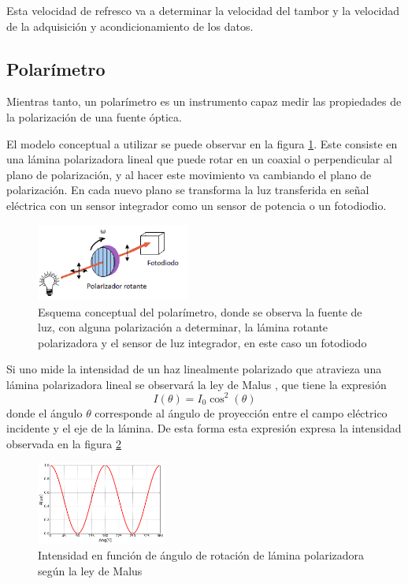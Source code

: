 Esta velocidad de refresco va a determinar la velocidad del tambor y la velocidad de la adquisición y acondicionamiento de los datos.

\subsection{Polarímetro}

Mientras tanto, un polarímetro es un instrumento capaz medir las propiedades de la polarización de una fuente óptica.

El modelo conceptual a utilizar se puede observar en la figura \ref{fig:polarimetro/esquema}. Este consiste en una lámina polarizadora lineal que puede rotar en un coaxial o perpendicular al plano de polarización, y al hacer este movimiento va cambiando el plano de polarización. En cada nuevo plano se transforma la luz transferida en señal eléctrica con un sensor integrador como un sensor de potencia o un fotodiodio. 

\begin{figure}[H]
    \centering
    \includegraphics[width=0.45\textwidth]{fig/polarimetro/esquema}
    \caption{Esquema conceptual del polarímetro, donde se observa la fuente de luz, con alguna polarización a determinar, la lámina rotante polarizadora y el sensor de luz integrador, en este caso un fotodiodo}
    \label{fig:polarimetro/esquema}
\end{figure}

Si uno mide la intensidad de un haz linealmente polarizado que atravieza una lámina polarizadora lineal se observará la ley de Malus \cite{goldstein_collete}, que tiene la expresión
\begin{equation}
    I(\theta) = I_0 \cos^2(\theta)
    \label{eq:malus}
\end{equation}
donde el ángulo $\theta$ corresponde al ángulo de proyección entre el campo eléctrico incidente y el eje de la lámina. De esta forma esta expresión expresa la intensidad observada en la figura \ref{fig:polarizacion/malus}

\begin{figure}[H]
    \centering
    \includegraphics[width=0.38\textwidth]{fig/polarimetro/malus}
    \caption{Intensidad en función de ángulo de rotación de lámina polarizadora según la ley de Malus}
    \label{fig:polarizacion/malus}
\end{figure}

